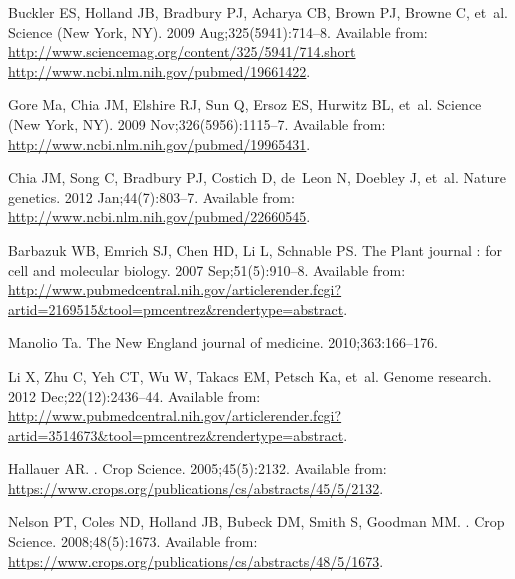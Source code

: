 \documentclass[10pt,letterpaper]{article}
\begin{document}
\begin{thebibliography}{}
Buckler ES, Holland JB, Bradbury PJ, Acharya CB, Brown PJ, Browne C, et~al.
\newblock Science (New York, NY). 2009 Aug;325(5941):714--8.
\newblock Available from:
  \url{http://www.sciencemag.org/content/325/5941/714.short
  http://www.ncbi.nlm.nih.gov/pubmed/19661422}.

Gore Ma, Chia JM, Elshire RJ, Sun Q, Ersoz ES, Hurwitz BL, et~al.
\newblock Science (New York, NY). 2009 Nov;326(5956):1115--7.
\newblock Available from: \url{http://www.ncbi.nlm.nih.gov/pubmed/19965431}.

Chia JM, Song C, Bradbury PJ, Costich D, de~Leon N, Doebley J, et~al.
\newblock Nature genetics. 2012 Jan;44(7):803--7.
\newblock Available from: \url{http://www.ncbi.nlm.nih.gov/pubmed/22660545}.

Barbazuk WB, Emrich SJ, Chen HD, Li L, Schnable PS.
\newblock The Plant journal : for cell and molecular biology. 2007
  Sep;51(5):910--8.
\newblock Available from:
  \url{http://www.pubmedcentral.nih.gov/articlerender.fcgi?artid=2169515\&tool=pmcentrez\&rendertype=abstract}.

Manolio Ta.
\newblock The New England journal of medicine. 2010;363:166--176.

Li X, Zhu C, Yeh CT, Wu W, Takacs EM, Petsch Ka, et~al.
\newblock Genome research. 2012 Dec;22(12):2436--44.
\newblock Available from:
  \url{http://www.pubmedcentral.nih.gov/articlerender.fcgi?artid=3514673\&tool=pmcentrez\&rendertype=abstract}.

Hallauer AR.
.
\newblock Crop Science. 2005;45(5):2132.
\newblock Available from:
  \url{https://www.crops.org/publications/cs/abstracts/45/5/2132}.

Nelson PT, Coles ND, Holland JB, Bubeck DM, Smith S, Goodman MM.
.
\newblock Crop Science. 2008;48(5):1673.
\newblock Available from:
  \url{https://www.crops.org/publications/cs/abstracts/48/5/1673}.


\end{thebibliography}
\end{document}
